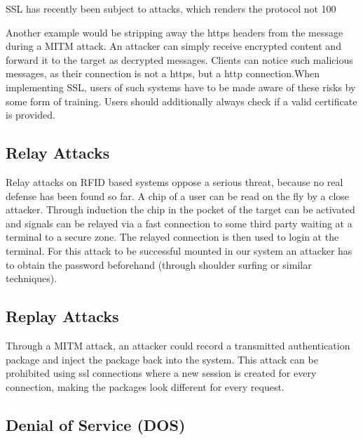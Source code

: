 \documentclass[12pt,a4paper,titlepage,oneside]{scrartcl}
\begin{document}
SSL has recently been subject to attacks, which renders the protocol not 100 %

Another example would be stripping away the https headers from the message during a MITM attack. An attacker can simply receive encrypted content and forward it to the target as decrypted messages. Clients can notice such malicious messages, as their connection is not a https, but a http connection.When implementing SSL, users of such systems have to be made aware of these risks by some form of training. Users should additionally always check if a valid certificate is provided.

\subsection{Relay Attacks}

Relay attacks on RFID based systems oppose a serious threat, because no real defense has been found so far. A chip of a user can be read on the fly by a close attacker. Through induction the chip in the pocket of the target can be activated and signals can be relayed via a fast connection to some third party waiting at a terminal to a secure zone. The relayed connection is then used to login at the terminal. For this attack to be successful mounted in our system an attacker has to obtain the password beforehand (through shoulder surfing or similar techniques).

\subsection{Replay Attacks}

Through a MITM attack, an attacker could record a transmitted authentication package and inject the package back into the system. This attack can be prohibited using ssl connections where a new session is created for every connection, making the packages look different for every request.

\subsection{Denial of Service (DOS)}
\end{document}
